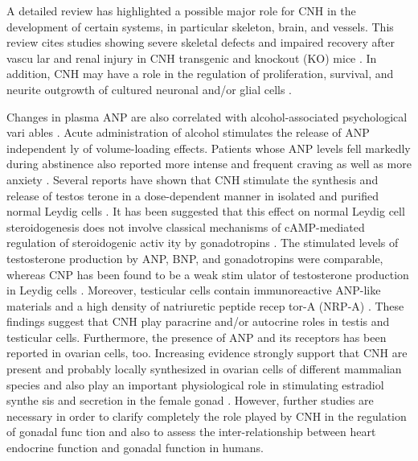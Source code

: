 \documentclass[14pt,a4paper,onecolumn]{extarticle}
\begin{document}
A  detailed review \citep{107} has highlighted a possible major role for CNH in the development of certain systems, in particular skeleton, brain, and vessels. This review cites  studies showing severe skeletal defects and impaired recovery after vascu lar and renal injury in CNH transgenic and knockout (KO) mice \citep{108}. In addition, CNH may have a role in the regulation of proliferation, survival, and neurite outgrowth of cultured neuronal and/or glial cells \citep{108}.

Changes in plasma ANP are also correlated with alcohol-associated psychological vari ables \citep{108}. Acute administration of alcohol stimulates the release of ANP independent ly of volume-loading effects. Patients whose ANP levels fell markedly during abstinence also reported more intense and frequent craving as well as more anxiety \citep{108}.  Several reports have shown that CNH stimulate the synthesis and release of testos terone in a dose-dependent manner in isolated and purified normal Leydig cells \citep{109} \citep{112}. It has been suggested that this effect on normal Leydig cell steroidogenesis does not involve classical mechanisms of cAMP-mediated regulation of steroidogenic activ ity by gonadotropins \citep{112}. The stimulated levels of testosterone production by ANP, BNP, and gonadotropins were comparable, whereas CNP has been found to be a weak stim ulator of testosterone production in Leydig cells \citep{112}. Moreover, testicular cells contain immunoreactive ANP-like materials and a high density of natriuretic peptide recep tor-A (NRP-A) \citep{112}. These findings suggest that CNH play paracrine and/or autocrine roles in testis and testicular cells. Furthermore, the presence of ANP and its receptors has been reported in ovarian cells, too. Increasing evidence strongly support that CNH are present and probably locally synthesized in ovarian cells of different mammalian species and also play an important physiological role in stimulating estradiol synthe sis and secretion in the female gonad \citep{112} \citep{113} \citep{114} \citep{115}. However, further studies are necessary in order to clarify completely the role played by CNH in the regulation of gonadal func tion and also to assess the inter-relationship between heart endocrine function and gonadal function in humans.
\end{document}
